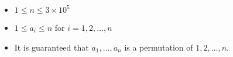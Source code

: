 \begin{itemize}
\tightlist
\item $1 \leq n \leq 3 \times 10 ^ 5$
\item $1 \leq a_i \leq n$ for $i = 1, 2, \ldots, n$
\item It is guaranteed that $a_1,\ldots,a_n$ is a permutation of $1, 2, \ldots, n$.
\end{itemize}
